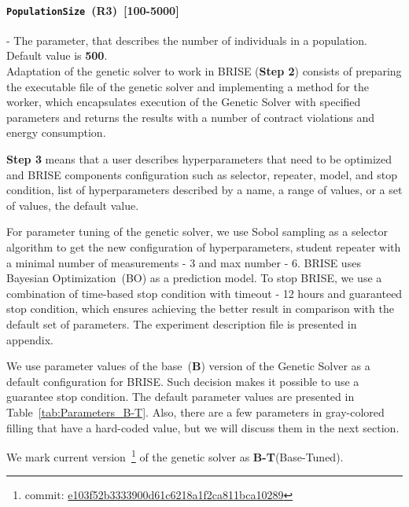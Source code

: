\paragraph{\texttt{PopulationSize}~(R3)~[100-5000]} - The parameter, that describes the number of individuals in a population. Default value is \textbf{500}. \\

Adaptation of the genetic solver to work in BRISE (\textbf{Step 2}) consists of preparing the executable file of the genetic solver and implementing a method for the worker, which encapsulates execution of the Genetic Solver with specified parameters and returns the results with a number of contract violations and energy consumption.

\textbf{Step 3} means that a user describes hyperparameters that need to be optimized and BRISE components configuration such as selector, repeater, model, and stop condition, list of hyperparameters described by a name, a range of values, or a set of values, the default value.

For parameter tuning of the genetic solver, we use Sobol sampling as a selector algorithm to get the new configuration of hyperparameters, student repeater with a minimal number of measurements - 3 and max number - 6. BRISE uses Bayesian Optimization~(BO) as a prediction model.
To stop BRISE, we use a combination of time-based stop condition with timeout - 12 hours and guaranteed stop condition, which ensures achieving the better result in comparison with the default set of parameters. The experiment description file is presented in appendix.

We use parameter values of the base~(\textbf{B}) version of the Genetic Solver as a default configuration for BRISE. Such decision makes it possible to use a guarantee stop condition. The default parameter values are presented in Table~\ref{tab:Parameters_B-T}. Also, there are a few parameters in gray-colored filling that have a hard-coded value, but we will discuss them in the next section. 

We mark current version~\footnote{commit: \href{https://git-st.inf.tu-dresden.de/mquat/mquat2/commit/e103f52b3333900d61c6218a1f2ca811bca10289}{e103f52b3333900d61c6218a1f2ca811bca10289}} of the genetic solver as \textbf{B-T}(Base-Tuned).



